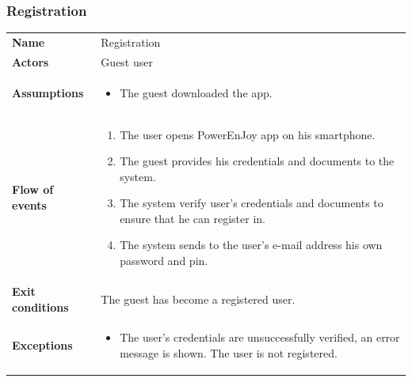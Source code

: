 \documentclass[english]{article}
\begin{document}
		\subsubsection{Registration}
		\begin{center}
		\begin{tabular}{l||p{10cm}}
		\textbf{Name} 
			& Registration\\ [8px]
		\textbf{Actors} 
			& Guest user\\ [8px]
		\textbf{Assumptions} 
			& \begin{itemize}
				\item The guest downloaded the app.
			\end{itemize}\\
		\textbf{Flow of events}
			& \begin{enumerate}
	 			\item The user opens PowerEnJoy app on his smartphone.
				\item The guest provides his credentials and documents to the system.
				\item The system verify user's credentials and documents to ensure that he can register in.
				\item The system sends to the user's e-mail address his own password and pin.
			\end{enumerate}\\ 
		\textbf{Exit conditions}
			& The guest has become a registered user.\\ [8px]
		\textbf{Exceptions}
			& \begin{itemize}
				\item The user's credentials are unsuccessfully verified, an error message is shown. The user is not registered.
			\end{itemize}
		\end{tabular}
		\end{center}
	
		\noindent
\end{document}
